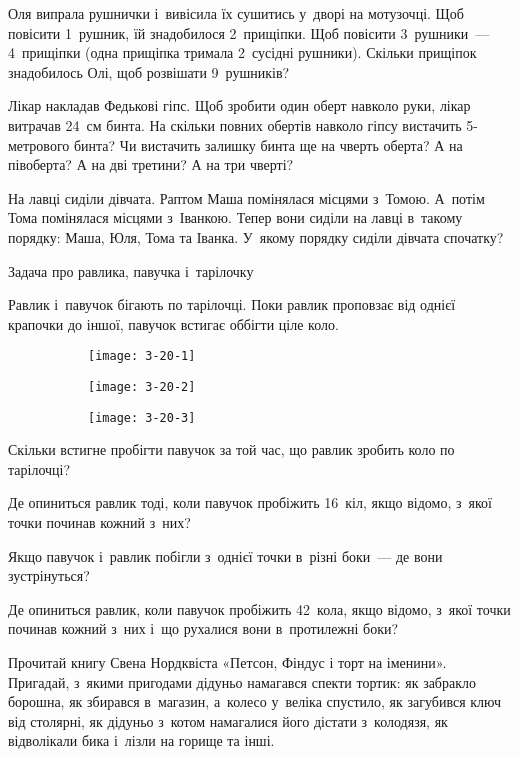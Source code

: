 \problem
Оля випрала рушнички і~вивісила їх сушитись у~дворі на мотузочці.
Щоб повісити 1~рушник, їй знадобилося 2~прищіпки.
Щоб повісити 3~рушники~--- 4~прищіпки (одна прищіпка тримала 2~сусідні рушники).
Скільки прищіпок знадобилось Олі, щоб розвішати 9~рушників?


\problem
Лікар накладав Федькові гіпс.
Щоб зробити один оберт навколо руки, лікар витрачав 24~см бинта.
На скільки повних обертів навколо гіпсу вистачить 5-метрового бинта?
Чи вистачить залишку бинта ще на чверть оберта?
А на півоберта?
А на дві третини?
А на три чверті?


\problem
На лавці сиділи дівчата. Раптом Маша помінялася місцями з~Томою.
А~потім Тома помінялася місцями з~Іванкою.
Тепер вони сиділи на лавці в~такому порядку: Маша, Юля, Тома та Іванка.
У~якому порядку сиділи дівчата спочатку?


\problem
Задача про равлика, павучка і~тарілочку

Равлик і~павучок бігають по тарілочці.
Поки равлик проповзає від однієї крапочки до іншої,
павучок встигає оббігти ціле коло.

\begin{figure}[h]
    \centering
    \begin{subfigure}{0.2\textwidth}
        \texttt{[image: 3-20-1]}
    \end{subfigure}
    \quad
    \begin{subfigure}{0.4\textwidth}
        \texttt{[image: 3-20-2]}
    \end{subfigure}
    \quad
    \begin{subfigure}{0.2\textwidth}
        \texttt{[image: 3-20-3]}
    \end{subfigure}
\end{figure}

Скільки встигне пробігти павучок за той час,
що равлик зробить коло по тарілочці? 

Де опиниться равлик тоді, коли павучок пробіжить 16~кіл,
якщо відомо, з~якої точки починав кожний з~них? 

Якщо павучок і~равлик побігли з~однієї точки в~різні боки~--- 
де вони зустрінуться? 

Де опиниться равлик, коли павучок пробіжить 42~кола, якщо відомо,
з~якої точки починав кожний з~них і~що рухалися вони в~протилежні боки?


\problem
Прочитай книгу Свена Нордквіста «Петсон, Фіндус і торт на іменини». Пригадай,
з~якими пригодами дідуньо намагався спекти тортик: як забракло борошна,
як збирався в~магазин, а~колесо у~веліка спустило, як загубився ключ
від столярні, як дідуньо з~котом намагалися його дістати з~колодязя,
як відволікали бика і~лізли на горище та інші.

